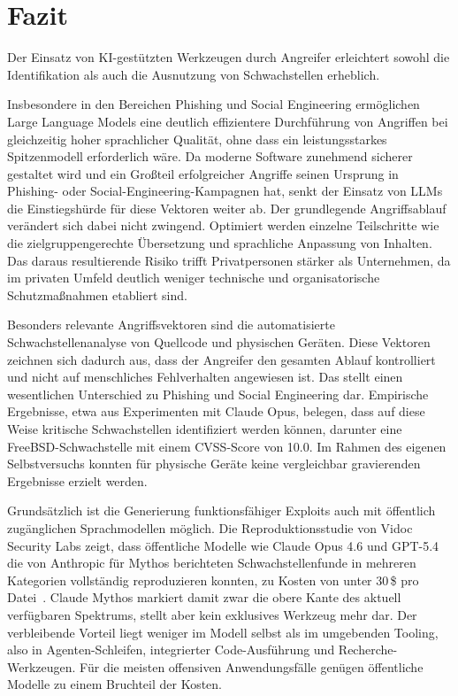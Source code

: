 \section{Fazit}
\label{sec:fazit}
Der Einsatz von KI-gestützten Werkzeugen durch Angreifer erleichtert sowohl die Identifikation als auch die Ausnutzung von Schwachstellen erheblich.

Insbesondere in den Bereichen Phishing und Social Engineering ermöglichen Large Language Models eine deutlich effizientere Durchführung von Angriffen bei gleichzeitig hoher sprachlicher Qualität, ohne dass ein leistungsstarkes Spitzenmodell erforderlich wäre. Da moderne Software zunehmend sicherer gestaltet wird und ein Großteil erfolgreicher Angriffe seinen Ursprung in Phishing- oder Social-Engineering-Kampagnen hat, senkt der Einsatz von LLMs die Einstiegshürde für diese Vektoren weiter ab. Der grundlegende Angriffsablauf verändert sich dabei nicht zwingend. Optimiert werden einzelne Teilschritte wie die zielgruppengerechte Übersetzung und sprachliche Anpassung von Inhalten. Das daraus resultierende Risiko trifft Privatpersonen stärker als Unternehmen, da im privaten Umfeld deutlich weniger technische und organisatorische Schutzmaßnahmen etabliert sind.

Besonders relevante Angriffsvektoren sind die automatisierte Schwachstellenanalyse von Quellcode und physischen Geräten. Diese Vektoren zeichnen sich dadurch aus, dass der Angreifer den gesamten Ablauf kontrolliert und nicht auf menschliches Fehlverhalten angewiesen ist. Das stellt einen wesentlichen Unterschied zu Phishing und Social Engineering dar. Empirische Ergebnisse, etwa aus Experimenten mit Claude Opus, belegen, dass auf diese Weise kritische Schwachstellen identifiziert werden können, darunter eine FreeBSD-Schwachstelle mit einem CVSS-Score von 10.0. Im Rahmen des eigenen Selbstversuchs konnten für physische Geräte keine vergleichbar gravierenden Ergebnisse erzielt werden.

Grundsätzlich ist die Generierung funktionsfähiger Exploits auch mit öffentlich zugänglichen Sprachmodellen möglich. Die Reproduktionsstudie von Vidoc Security Labs zeigt, dass öffentliche Modelle wie Claude Opus 4.6 und GPT-5.4 die von Anthropic für Mythos berichteten Schwachstellenfunde in mehreren Kategorien vollständig reproduzieren konnten, zu Kosten von unter 30\,\$ pro Datei~\cite{vidoc_mythos_reproduction_2026}. Claude Mythos markiert damit zwar die obere Kante des aktuell verfügbaren Spektrums, stellt aber kein exklusives Werkzeug mehr dar. Der verbleibende Vorteil liegt weniger im Modell selbst als im umgebenden Tooling, also in Agenten-Schleifen, integrierter Code-Ausführung und Recherche-Werkzeugen. Für die meisten offensiven Anwendungsfälle genügen öffentliche Modelle zu einem Bruchteil der Kosten.

